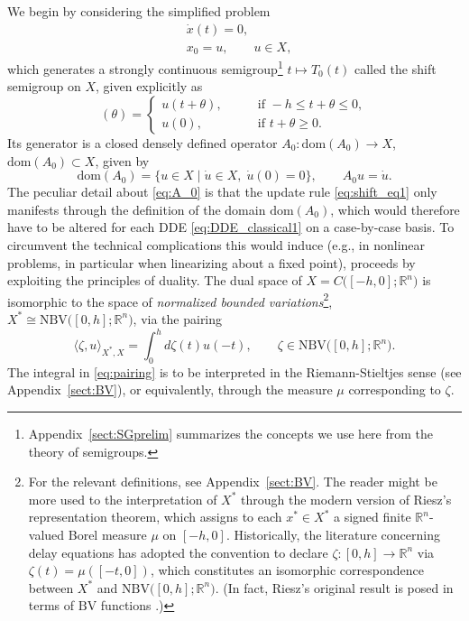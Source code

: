 \documentclass[a4paper, 12pt, oneside, reqno, notitlepage]{amsart}
\theoremstyle{plain}
\theoremstyle{definition}
\theoremstyle{remark}
\newcommand{\dom}{\mathrm{dom}}
\newcommand{\nbv}{\mathrm{NBV}}
\newcommand{\bv}{\mathrm{BV}}
\begin{document}
We begin by considering the simplified problem
\begin{subequations}\label{eq:shift_eq}
\begin{align}
&\dot{x}(t) = 0,  \label{eq:shift_eq1} \\ 
& x_0 = u, \qquad u \in X,  
\end{align}
\end{subequations}
which generates a strongly continuous semigroup\footnote{Appendix~\ref{sect:SGprelim} summarizes the concepts we use here from the theory of semigroups.} $t \mapsto T_0(t)$ called the shift semigroup on $X$, given explicitly as
\begin{equation}
    [T_0(t)u](\theta) = \begin{cases}
        u(t+\theta), \qquad & \text{if } -h \leq t + \theta \leq 0, \\
        u(0), & \text{if } t + \theta \geq 0.
    \end{cases}
    \label{eq:T_0(t)}
\end{equation}
Its generator is a closed densely defined operator $A_0 : \dom(A_0) \to X$, $\dom(A_0) \subset X$, given by
\begin{equation}
    \dom(A_0) = \Big\{ u \in X \; \big| \; \dot{u} \in X, \; \dot{u}(0) = 0 \Big\}, \qquad A_0u = \dot{u}.
    \label{eq:A_0}
\end{equation}
The peculiar detail about \eqref{eq:A_0} is that the update rule \eqref{eq:shift_eq1} only manifests through the definition of the domain $\dom(A_0)$, which would therefore have to be altered for each DDE \eqref{eq:DDE_classical1} on a case-by-case basis.
To circumvent the technical complications this would induce (e.g., in nonlinear problems, in particular when linearizing about a fixed point), \cite{diekmann2012delay} proceeds by exploiting the principles of duality.
The dual space of $X = C\big([-h,0];\mathbb{R}^n \big)$ is 
isomorphic to the space of \textit{normalized bounded variations}\footnote{
For the relevant definitions, see Appendix~\ref{sect:BV}.
The reader might be more used to the interpretation of $X^*$ through the modern version of Riesz's representation theorem,
which assigns to each $x^* \in X^*$ a signed finite $\mathbb{R}^n$-valued Borel measure $\mu$ on $[-h,0]$.
Historically, the literature concerning delay equations has adopted the convention to declare $\zeta: [0,h] \to \mathbb{R}^n$ via $\zeta(t)=\mu([-t,0])$, which constitutes an isomorphic correspondence between $X^*$ and $\nbv\big([0,h];\mathbb{R}^n\big)$. (In fact, Riesz's original result is posed in terms of $\bv$ functions \cite{Riesz1909Sur}.) 
},
$X^*\cong \nbv\big([0,h];\mathbb{R}^n\big)$, via the pairing
\begin{equation}
    \langle \zeta,u \rangle_{X^*,X} = \int_0^h d\zeta(t) u(-t), \qquad \zeta \in \nbv\big([0,h];\mathbb{R}^n\big).
    \label{eq:pairing}
\end{equation}
The integral in \eqref{eq:pairing} is to be interpreted in the Riemann-Stieltjes sense (see Appendix~\ref{sect:BV}), or equivalently, through the measure $\mu$ corresponding to $\zeta$.
\end{document}
